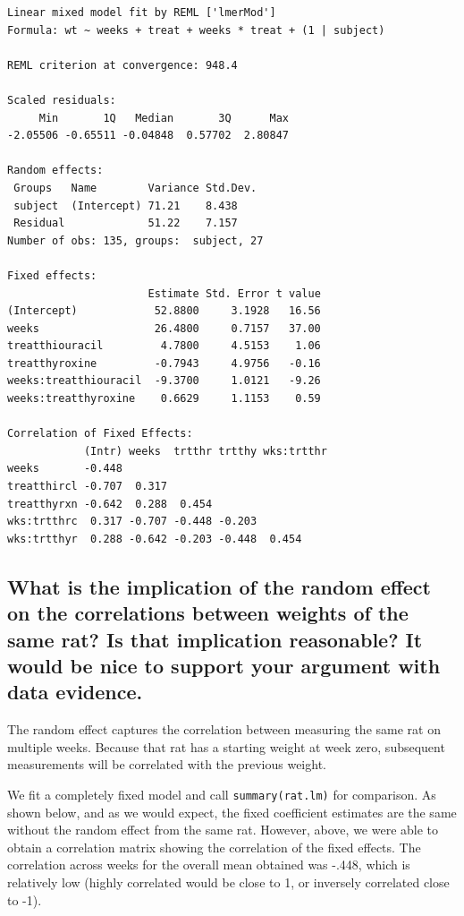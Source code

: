 \documentclass[11pt]{article}
\begin{document}
\begin{verbatim}
Linear mixed model fit by REML ['lmerMod']
Formula: wt ~ weeks + treat + weeks * treat + (1 | subject)

REML criterion at convergence: 948.4

Scaled residuals: 
     Min       1Q   Median       3Q      Max 
-2.05506 -0.65511 -0.04848  0.57702  2.80847 

Random effects:
 Groups   Name        Variance Std.Dev.
 subject  (Intercept) 71.21    8.438   
 Residual             51.22    7.157   
Number of obs: 135, groups:  subject, 27

Fixed effects:
                      Estimate Std. Error t value
(Intercept)            52.8800     3.1928   16.56
weeks                  26.4800     0.7157   37.00
treatthiouracil         4.7800     4.5153    1.06
treatthyroxine         -0.7943     4.9756   -0.16
weeks:treatthiouracil  -9.3700     1.0121   -9.26
weeks:treatthyroxine    0.6629     1.1153    0.59

Correlation of Fixed Effects:
            (Intr) weeks  trtthr trtthy wks:trtthr
weeks       -0.448                                
treatthircl -0.707  0.317                         
treatthyrxn -0.642  0.288  0.454                  
wks:trtthrc  0.317 -0.707 -0.448 -0.203           
wks:trtthyr  0.288 -0.642 -0.203 -0.448  0.454    
\end{verbatim}
\subsection{What is the implication of the random effect on the correlations between weights of the same rat? Is that implication reasonable? It would be nice to support your argument with data evidence.}
\label{sec-1-2}


The random effect captures the correlation between measuring the same
rat on multiple weeks. Because that rat has a starting weight at week
zero, subsequent measurements will be correlated with the previous weight.
 
We fit a completely fixed model and call \verb~summary(rat.lm)~ for
comparison. As shown below, and as we would expect, 
the fixed coefficient estimates are the same without the random
effect from the same rat. However, above, we were able to obtain a
correlation matrix showing the correlation of the fixed effects. The
correlation across weeks for the overall mean obtained was -.448,
which is relatively low (highly correlated would be close to 1, or
inversely correlated close to -1). 
\end{document}
